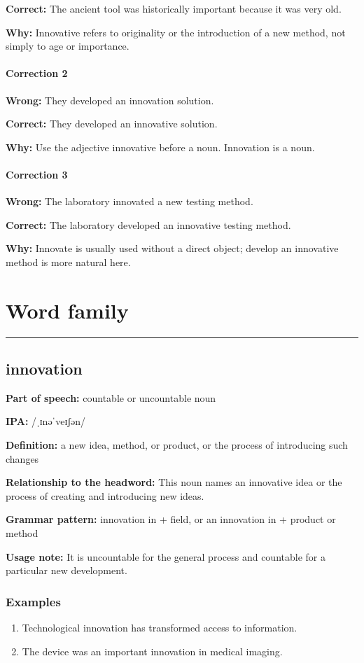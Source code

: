 \documentclass[11pt]{article}
\newcommand{\sectionrule}{\par\vspace{-0.5em}\noindent\textcolor{Accent}{\rule{\linewidth}{0.6pt}}\par}
\begin{document}
\textbf{Correct:} The ancient tool was historically important because it was very old.

\textbf{Why:} Innovative refers to originality or the introduction of a new method, not simply to age or importance.

\paragraph{Correction 2}
\textbf{Wrong:} They developed an innovation solution.

\textbf{Correct:} They developed an innovative solution.

\textbf{Why:} Use the adjective innovative before a noun. Innovation is a noun.

\paragraph{Correction 3}
\textbf{Wrong:} The laboratory innovated a new testing method.

\textbf{Correct:} The laboratory developed an innovative testing method.

\textbf{Why:} Innovate is usually used without a direct object; develop an innovative method is more natural here.

\section{Word family}
\sectionrule
\subsection{innovation}
\textbf{Part of speech:} countable or uncountable noun

\textbf{IPA:} /ˌɪnəˈveɪʃən/

\textbf{Definition:} a new idea, method, or product, or the process of introducing such changes

\textbf{Relationship to the headword:} This noun names an innovative idea or the process of creating and introducing new ideas.

\textbf{Grammar pattern:} innovation in + field, or an innovation in + product or method

\textbf{Usage note:} It is uncountable for the general process and countable for a particular new development.

\subsubsection{Examples}
\begin{enumerate}
  \item Technological innovation has transformed access to information.
  \item The device was an important innovation in medical imaging.
\end{enumerate}
\end{document}
